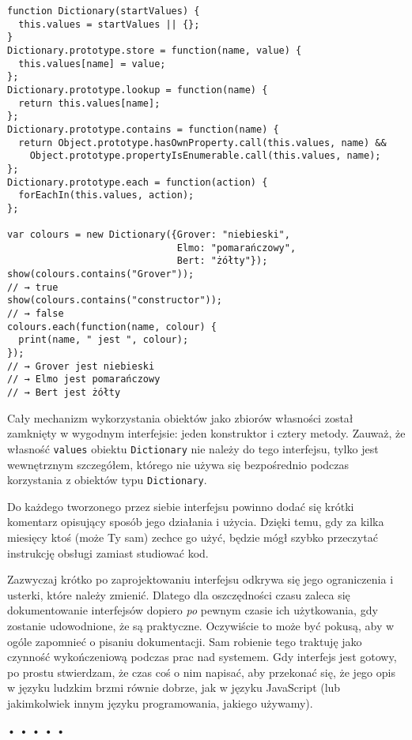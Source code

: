   
\begin{verbatim} 
function Dictionary(startValues) {
  this.values = startValues || {};
}
Dictionary.prototype.store = function(name, value) {
  this.values[name] = value;
};
Dictionary.prototype.lookup = function(name) {
  return this.values[name];
};
Dictionary.prototype.contains = function(name) {
  return Object.prototype.hasOwnProperty.call(this.values, name) &&
    Object.prototype.propertyIsEnumerable.call(this.values, name);
};
Dictionary.prototype.each = function(action) {
  forEachIn(this.values, action);
};

var colours = new Dictionary({Grover: "niebieski",
                              Elmo: "pomarańczowy",
                              Bert: "żółty"});
show(colours.contains("Grover"));
// → true
show(colours.contains("constructor"));
// → false
colours.each(function(name, colour) {
  print(name, " jest ", colour);
});
// → Grover jest niebieski
// → Elmo jest pomarańczowy
// → Bert jest żółty
\end{verbatim}
  
Cały mechanizm wykorzystania obiektów jako zbiorów własności został zamknięty w wygodnym interfejsie: jeden konstruktor i cztery metody. Zauważ, że własność \texttt{values} obiektu \texttt{Dictionary} nie należy do tego interfejsu, tylko jest wewnętrznym szczegółem, którego nie używa się bezpośrednio podczas korzystania z obiektów typu \texttt{Dictionary}.

  
Do każdego tworzonego przez siebie interfejsu powinno dodać się krótki komentarz opisujący sposób jego działania i użycia. Dzięki temu, gdy za kilka miesięcy ktoś (może Ty sam) zechce go użyć, będzie mógł szybko przeczytać instrukcję obsługi zamiast studiować kod.

  
Zazwyczaj krótko po zaprojektowaniu interfejsu odkrywa się jego ograniczenia i usterki, które należy zmienić. Dlatego dla oszczędności czasu zaleca się dokumentowanie interfejsów dopiero \emph{po} pewnym czasie ich użytkowania, gdy zostanie udowodnione, że są praktyczne. Oczywiście to może być pokusą, aby w ogóle zapomnieć o pisaniu dokumentacji. Sam robienie tego traktuję jako czynność wykończeniową podczas prac nad systemem. Gdy interfejs jest gotowy, po prostu stwierdzam, że czas coś o nim napisać, aby przekonać się, że jego opis w języku ludzkim brzmi równie dobrze, jak w języku JavaScript (lub jakimkolwiek innym języku programowania, jakiego używamy).



\begin{center}
• • • • •
\end{center}

